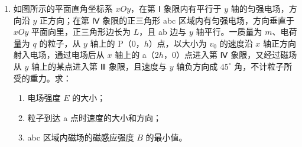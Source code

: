 \documentclass[\gkver]{gaokaozhenti}
\begin{document}
\begin{enumerate}
\item
如图所示的平面直角坐标系 $xOy$，在第 Ⅰ 象限内有平行于 $y$ 轴的匀强电场，方向沿 $y$ 正方向；在第 Ⅳ 象限的正三角形 abc 区域内有匀强电场，方向垂直于 $xOy$ 平面向里，正三角形边长为 $L$，且 ab 边与 $y$ 轴平行。一质量为 $m$、电荷量为 $q$ 的粒子，从 $y$ 轴上的 P（0，$h$）点，以大小为 $v_{0}$ 的速度沿 $x$ 轴正方向射入电场，通过电场后从 $x$ 轴上的 a（2$h$，0）点进入第 Ⅳ 象限，又经过磁场从 $y$ 轴上的某点进入第 Ⅲ 象限，且速度与 $y$ 轴负方向成 $45^{\circ}$ 角，不计粒子所受的重力。求：
\begin{enumerate}
	\item
	电场强度 $E$ 的大小；
	\item
	粒子到达 a 点时速度的大小和方向；
	\item
	abc 区域内磁场的磁感应强度 $B$ 的最小值。
\end{enumerate}




\end{enumerate}
\end{document}
